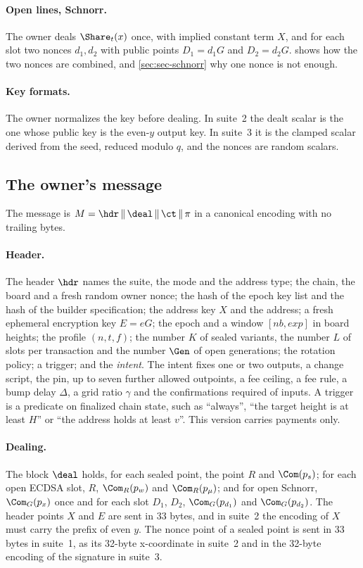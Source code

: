 \paragraph{Open lines, Schnorr.} The owner deals $\Share_t(x)$ once, with implied constant term $X$, and for each slot two nonces $d_1, d_2$ with public points $D_1 = d_1 G$ and $D_2 = d_2 G$.  shows how the two nonces are combined, and \cref{sec:sec-schnorr} why one nonce is not enough.

\paragraph{Key formats.} The owner normalizes the key before dealing. In suite~2 the dealt scalar is the one whose public key is the even-$y$ output key. In suite~3 it is the clamped scalar derived from the seed, reduced modulo $q$, and the nonces are random scalars.

\subsection{The owner's message}\label{sec:msg}

The message is $M = \hdr \,\|\, \deal \,\|\, \ct \,\|\, \pi$ in a canonical encoding with no trailing bytes.

\paragraph{Header.} The header $\hdr$ names the suite, the mode and the address type; the chain, the board and a fresh random owner nonce; the hash of the epoch key list and the hash of the builder specification; the address key $X$ and the address; a fresh ephemeral encryption key $E = eG$; the epoch and a window $[nb, exp]$ in board heights; the profile $(n,t,f)$; the number $K$ of sealed variants, the number $L$ of slots per transaction and the number $\Gen$ of open generations; the rotation policy; a trigger; and the \emph{intent}. The intent fixes one or two outputs, a change script, the pin, up to seven further allowed outpoints, a fee ceiling, a fee rule, a bump delay $\Delta$, a grid ratio $\gamma$ and the confirmations required of inputs. A trigger is a predicate on finalized chain state, such as ``always'', ``the target height is at least $H$'' or ``the address holds at least $v$''. This version carries payments only.

\paragraph{Dealing.} The block $\deal$ holds, for each sealed point, the point $R$ and $\Com(p_s)$; for each open ECDSA slot, $R$, $\Com_R(p_w)$ and $\Com_R(p_\mu)$; and for open Schnorr, $\Com_G(p_x)$ once and for each slot $D_1$, $D_2$, $\Com_G(p_{d_1})$ and $\Com_G(p_{d_2})$. The header points $X$ and $E$ are sent in 33 bytes, and in suite~2 the encoding of $X$ must carry the prefix of even $y$. The nonce point of a sealed point is sent in 33 bytes in suite~1, as its 32-byte x-coordinate in suite~2 and in the 32-byte encoding of the signature in suite~3.

